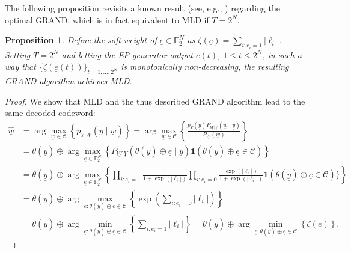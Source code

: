 \documentclass[letterpaper,draftclsnofoot,onecolumn]{IEEEtran}
\newtheorem{proposition}{Proposition}
\begin{document}
The following proposition revisits a known result (see, e.g., \cite{Lin2004ErrorCC, solomon2020SGRAND, liu2022orbgrand}) regarding the optimal GRAND, which is in fact equivalent to MLD if $T = 2^N$.

\begin{proposition}\label{prop:equal_ml}
    Define the soft weight of $\underline{e} \in \mathbb{F}_2^N$ as $\zeta(\underline{e}) = \sum_{i:e_i = 1} |\ell_i|$. Setting $T = 2^N$ and letting the EP generator output $\underline{e}(t)$, $1 \leq t \leq 2^N$, in such a way that $\{\zeta(\underline{e}(t))\}_{t = 1,\ldots,2^N}$ is monotonically non-decreasing, the resulting GRAND algorithm achieves MLD.
\end{proposition}
\begin{proof} We show that MLD and the thus described GRAND algorithm lead to the same decoded codeword: 
\begin{align}
    \hat{\underline{w}} & = \arg\max_{\underline{w}\in \mathcal{C}}\left\{p_{\underline{Y}|\underline{W}}(\underline{y} \mid \underline{w})\right\} = \arg\max_{\underline{w}\in \mathcal{C}}\left\{\frac{p_{\underline{Y}}(\underline{y})P_{\underline{W}|\underline{Y}}(\underline{w} \mid \underline{y})}{P_{\underline{W}}(\underline{w})}\right\} \\
    & = \theta(\underline{y}) \oplus \arg\max_{\underline{e}\in \mathbb{F}_2^N}\left\{P_{\underline{W}|\underline{Y}}(\theta(\underline{y})\oplus \underline{e} \mid \underline{y})\mathbf{1}(\theta(\underline{y})\oplus \underline{e}\in \mathcal{C})\right\}\label{eq:ml_23}\\
    & = \theta(\underline{y}) \oplus \arg\max_{\underline{e}\in \mathbb{F}_2^N}\left\{\prod_{i:e_i = 1}\frac{1}{1+\exp(|\ell_i|)}\prod_{i:e_i = 0}\frac{\exp(|\ell_i|)}{1+\exp(|\ell_i|)}\mathbf{1}(\theta(\underline{y})\oplus \underline{e}\in \mathcal{C})\}\right\}\label{eq:ml_3} \\
    & = \theta(\underline{y}) \oplus \arg\max_{\underline{e}:\theta(\underline{y})\oplus \underline{e}\in \mathcal{C}}\left\{\exp\left(\sum_{i:e_i = 0}|\ell_i|\right)\right\} \\
    & = \theta(\underline{y}) \oplus \arg\min_{\underline{e}:\theta(\underline{y})\oplus \underline{e}\in \mathcal{C}}\left\{\sum_{i:e_i=1} |\ell_i|\right\} = \theta(\underline{y}) \oplus \arg\min_{\underline{e}:\theta(\underline{y})\oplus \underline{e}\in \mathcal{C}} \left\{\zeta(\underline{e})\right\}. \label{eq:ml_4}

\end{align}
\end{proof}
\end{document}
